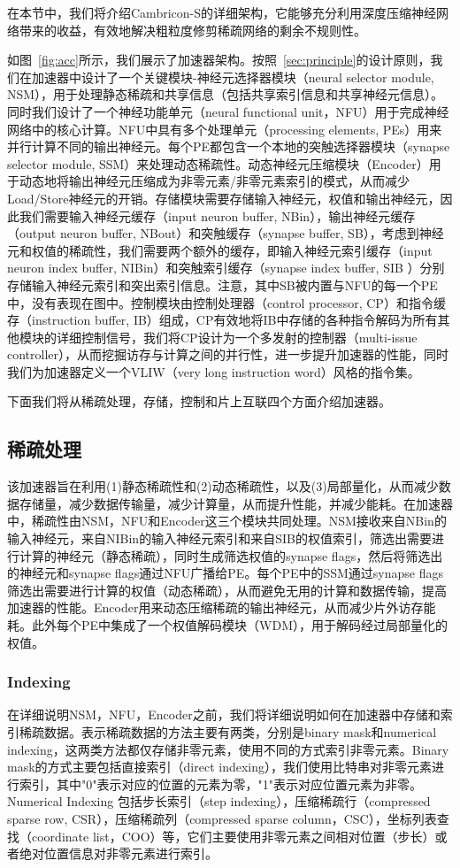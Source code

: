 在本节中，我们将介绍Cambricon-S的详细架构，它能够充分利用深度压缩神经网络带来的收益，有效地解决粗粒度修剪稀疏网络的剩余不规则性。

如图~\ref{fig:acc}所示，我们展示了加速器架构。按照~\ref{sec:principle}的设计原则，我们在加速器中设计了一个关键模块-神经元选择器模块（neural selector module, NSM），用于处理静态稀疏和共享信息（包括共享索引信息和共享神经元信息）。同时我们设计了一个神经功能单元（neural functional unit，NFU）用于完成神经网络中的核心计算。NFU中具有多个处理单元（processing elements, PEs）用来并行计算不同的输出神经元。每个PE都包含一个本地的突触选择器模块（synapse selector module, SSM）来处理动态稀疏性。动态神经元压缩模块（Encoder）用于动态地将输出神经元压缩成为非零元素/非零元素索引的模式，从而减少Load/Store神经元的开销。存储模块需要存储输入神经元，权值和输出神经元，因此我们需要输入神经元缓存（input neuron buffer, NBin），输出神经元缓存（output neuron buffer, NBout）和突触缓存（synapse buffer, SB），考虑到神经元和权值的稀疏性，我们需要两个额外的缓存，即输入神经元索引缓存（input neuron index buffer, NIBin）和突触索引缓存（synapse index buffer, SIB ）分别存储输入神经元索引和突出索引信息。注意，其中SB被内置与NFU的每一个PE中，没有表现在图中。控制模块由控制处理器（control processor, CP）和指令缓存（instruction buffer, IB）组成，CP有效地将IB中存储的各种指令解码为所有其他模块的详细控制信号，我们将CP设计为一个多发射的控制器（multi-issue controller），从而挖掘访存与计算之间的并行性，进一步提升加速器的性能，同时我们为加速器定义一个VLIW（very long instruction word）风格的指令集。

下面我们将从稀疏处理，存储，控制和片上互联四个方面介绍加速器。

\subsection{稀疏处理}
该加速器旨在利用(1)静态稀疏性和(2)动态稀疏性，以及(3)局部量化，从而减少数据存储量，减少数据传输量，减少计算量，从而提升性能，并减少能耗。在加速器中，稀疏性由NSM，NFU和Encoder这三个模块共同处理。NSM接收来自NBin的输入神经元，来自NIBin的输入神经元索引和来自SIB的权值索引，筛选出需要进行计算的神经元（静态稀疏），同时生成筛选权值的synapse flags，然后将筛选出的神经元和synapse flags通过NFU广播给PE。每个PE中的SSM通过synapse flags筛选出需要进行计算的权值（动态稀疏），从而避免无用的计算和数据传输，提高加速器的性能。Encoder用来动态压缩稀疏的输出神经元，从而减少片外访存能耗。此外每个PE中集成了一个权值解码模块（WDM），用于解码经过局部量化的权值。

\subsubsection{Indexing}
在详细说明NSM，NFU，Encoder之前，我们将详细说明如何在加速器中存储和索引稀疏数据。表示稀疏数据的方法主要有两类，分别是binary mask和numerical indexing，这两类方法都仅存储非零元素，使用不同的方式索引非零元素。Binary mask的方式主要包括直接索引（direct indexing），我们使用比特串对非零元素进行索引，其中"0"表示对应的位置的元素为零，"1"表示对应位置元素为非零。Numerical Indexing 包括步长索引（step indexing），压缩稀疏行（compressed sparse row, CSR），压缩稀疏列（compressed sparse column，CSC），坐标列表查找（coordinate list，COO）等，它们主要使用非零元素之间相对位置（步长）或者绝对位置信息对非零元素进行索引。


